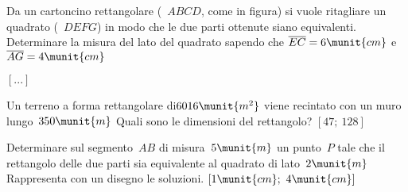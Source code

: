 \begin{htmulticols}{2}
\begin{comment}
\begin{esercizio}[*]
 \label{ese:3.132}
Un capitale di 12000 euro è depositato in banca a un certo tasso di 
interesse
annuale. Alla scadenza del primo anno gli interessi maturati vengono
ridepositati sullo stesso conto. Alla scadenza del secondo anno si ritira 
la
somma di 12854,70 euro. Qual è stato il tasso di interesse?
\hfill\(\left[3,5\%\right]\)
\end{esercizio}

\begin{esercizio}
 \label{ese:3.133}
In un rettangolo, se si aumenta di 2 metri la base e si riduce di un metro
l'altezza, la sua area aumenta di 4 metri quadrati. Se invece si riduce di
un metro la base e si aumenta di 2 metri l'altezza, l'area aumenta di 22
metri quadrati. Quali sono le dimensioni del rettangolo?
\hfill\(\left[...\right]\)
\end{esercizio}

\begin{esercizio}[*]
 \label{ese:3.134}
Una ditta spende mensilmente 73500 in stipendi per i propri dipendenti.
Aumentando di 5 il numero dei dipendenti, ma riducendo l'orario di lavoro,
diminuisce a ciascuno lo stipendio di 200 e spende solamente 2500 in più 
per
gli stipendi. Quanti dipendenti aveva inizialmente la ditta e quanto
guadagnava ognuno di essi?
\hfill\(\left[35;~2100\right]\)
\end{esercizio}

\end{comment}

\begin{esercizio}[*]
 \label{ese:3.135}
Da un cartoncino rettangolare (~\(ABCD\), come in figura) si vuole 
ritagliare 
un
quadrato (~\(DEFG\)) in modo che le due parti ottenute siano equivalenti.
Determinare la misura del lato del quadrato sapendo che
\(\overline {EC} = 6\munit{cm}\) e\(\overline {AG} = 4\munit{cm}\)
\begin{center}
 
\end{center}
\hfill\(\left[...\right]\)
\end{esercizio}

\begin{esercizio}[*]
 \label{ese:3.136}
Un terreno a forma rettangolare di\(6016\munit{m^2}\) viene recintato con un 
muro 
lungo~\(350\munit{m}\) Quali sono le dimensioni del rettangolo?
\hfill\(\left[47;~128\right]\)
\end{esercizio}

\begin{esercizio}[*]
 \label{ese:3.137}
Determinare sul segmento~\(AB\) di misura~\(5\munit{m}\) un punto~\(P\) tale 
che 
il rettangolo delle due parti sia equivalente al quadrato di 
lato~\(2\munit{m}\) Rappresenta con un disegno le soluzioni.
\hfill\(\left[1\munit{cm};~4\munit{cm}\right]\)
\end{esercizio}


\end{htmulticols}
